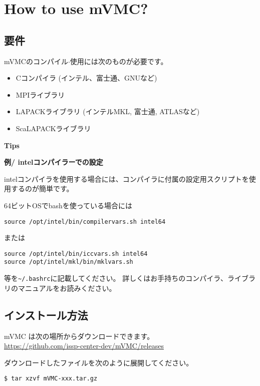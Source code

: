 \chapter{How to use mVMC?}
\label{Ch:HowTo}

\section{要件}

mVMCのコンパイル$\cdot$使用には次のものが必要です。
\begin{itemize}
\item Cコンパイラ (インテル、富士通、GNUなど)
\item MPIライブラリ
\item LAPACKライブラリ (インテルMKL, 富士通, ATLASなど)
\item ScaLAPACKライブラリ
\end{itemize}

\begin{screen}
\Large 
{\bf Tips}
\normalsize

{\bf 例/ intelコンパイラーでの設定}

intelコンパイラを使用する場合には、コンパイラに付属の設定用スクリプトを使用するのが簡単です。

64ビットOSでbashを使っている場合には
\begin{verbatim}
source /opt/intel/bin/compilervars.sh intel64
\end{verbatim}
または
\begin{verbatim}
source /opt/intel/bin/iccvars.sh intel64
source /opt/intel/mkl/bin/mklvars.sh
\end{verbatim}
等を\verb|~/.bashrc|に記載してください。
詳しくはお手持ちのコンパイラ、ライブラリのマニュアルをお読みください。

\end{screen}

\section{インストール方法}

mVMC は次の場所からダウンロードできます。\\
\url{https://github.com/issp-center-dev/mVMC/releases}


ダウンロードしたファイルを次のように展開してください。
\begin{verbatim}
$ tar xzvf mVMC-xxx.tar.gz
\end{verbatim}

